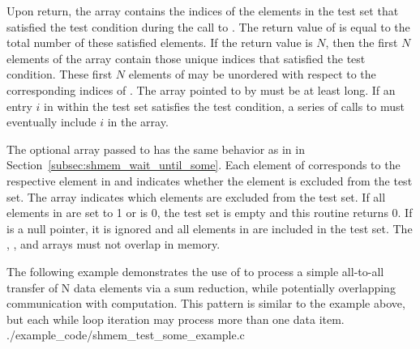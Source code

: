 \begin{apidefinition}
{    Upon return, the  array contains the indices of the elements
    in the test set that satisfied the test condition during the call to
    .  The return value of  is
    equal to the total number of these satisfied elements.  If the return value
    is $N$, then the first $N$ elements of the  array contain
    those unique indices that satisfied the test condition.
    These first $N$ elements of  may be unordered with respect to
    the corresponding indices of .
    The array pointed
    to by  must be at least  long.
    If an entry $i$ in  within the test set satisfies the test
    condition, a series of calls to  must eventually
    include $i$ in the  array.

    The optional  array passed to  has the
    same behavior as in  in
    Section~\ref{subsec:shmem_wait_until_some}.   Each element of 
    corresponds to the respective element in  and indicates whether
    the element is excluded from the test set.  The 
    array indicates which elements are excluded from the test set.  If all
    elements in  are set to 1 or  is 0, the test set is
    empty and this routine returns 0.  If  is a null pointer, it is ignored and all
    elements in  are included in the test set.  The ,
    , and  arrays must not overlap in memory.
}



\begin{apiexamples}
  \apicexample
      {The following \Cstd[11] example demonstrates the use of
       to process a simple all-to-all transfer of N
      data elements via a sum reduction, while potentially overlapping
      communication with computation.  This pattern is similar to the
       example above, but each while loop iteration may
      process more than one data item.}
      {./example_code/shmem_test_some_example.c}
      {}
\end{apiexamples}

\end{apidefinition}
